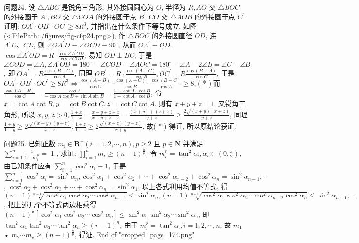 问题24. 设 $\triangle A B C$ 是锐角三角形, 其外接圆圆心为 $O$, 半径为 $R, A O$ 交 $\triangle B O C$ 的外接圆于 $A^{\prime}, B O$ 交 $\triangle C O A$ 的外接圆于点 $B^{\prime}, C O$ 交 $\triangle A O B$ 的外接圆于点 $C^{\prime}$. 证明: $O A^{\prime} \cdot O B^{\prime} \cdot O C^{\prime} \geqslant 8 R^3$, 并指出在什么条件下等号成立.
如图(<FilePath:./figures/fig-c6p24.png>), 作 $\triangle B O C$ 的外接圆直径 $O D$, 连 $A^{\prime} D 、 C D$, 则 $\angle O A^{\prime} D=\angle O C D=90^{\circ}$, 从而 $O A^{\prime}=O D$. $\cos \angle A^{\prime} O D=R \cdot \frac{\cos \angle A^{\prime} O D}{\cos \angle C O D}$; 易知 $O D \perp B C$, 于是 $\angle C O D=\angle A, \angle A^{\prime} O D=180^{\circ}-\angle C O D- \angle A O C=180^{\circ}-\angle A-2 \angle B=\angle C-\angle B$, 即 $O A^{\prime}= R \frac{\cos (B-C)}{\cos A}$, 同理 $O B^{\prime}=R \cdot \frac{\cos (A-C)}{\cos B}, O C^{\prime}= R \frac{\cos (B-A)}{\cos C}$, 于是 $O A^{\prime} \cdot O B^{\prime} \cdot O C^{\prime} \geqslant 8 R^3 \Leftrightarrow\frac{\cos (A-B)}{\cos C} \cdot \frac{\cos (A-C)}{\cos B} \cdot \frac{\cos (B-C)}{\cos A} \geqslant 8$, ( * ) 而 $\frac{\cos (A-B)}{\cos C}= \frac{\cos A}{-\cos A \cos B+\sin A \sin B}=\frac{1+\cot A \cdot \cot B}{1-\cot A \cdot \cot B}$, 令 $x=\cot A \cot B, y= \cot B \cot C, z=\cot C \cot A$. 则有 $x+y+z=1$, 又锐角三角形, 所以 $x, y$, $z>0, \frac{1+x}{1-x}=\frac{x+y+z+x}{x+y+z-x}=\frac{(x+y)+(z+x)}{y+z} \geqslant \frac{2 \sqrt{(x+y)(x+z)}}{y+z}$, 同理 $\frac{1+y}{1-y} \geqslant 2 \frac{\sqrt{(x+y)(y+z)}}{x+z}, \frac{1+z}{1-z} \geqslant 2 \frac{\sqrt{(x+z)(y+z)}}{x+y}$, 故( * ) 得证, 所以原结论获证.



问题25. 已知正数 $m_i \in \mathbf{R}^{+}(i=1,2, \cdots, n), p \geqslant 2$ 且 $p \in \mathbf{N}$ 并满足 $\sum_{i=1}^n \frac{1}{1+m_i^p}=$ 1 , 求证: $\prod_{i=1}^n m_i \geqslant(n-1)^{\frac{n}{p}}$.
令 $m_i^p=\tan ^2 \alpha_i, \alpha_i \in\left(0, \frac{\pi}{2}\right)$, 由已知条件应有 $\sum_{i=1}^n \cos ^2 \alpha_i=1$, 于是 $\sum_{i=1}^{n-1} \cos ^2 \alpha_i=\sin ^2 \alpha_n, \cos ^2 \alpha_1+\cos ^2 \alpha_2+\cdots+\cos ^2 \alpha_{n-2}+\cos ^2 \alpha_n=\sin ^2 \alpha_{n-1}, \cdots$, $\cos ^2 \alpha_2+\cos ^2 \alpha_3+\cdots+\cos ^2 \alpha_n=\sin ^2 \alpha_1$, 以上各式利用均值不等式, 得 $(n-1) \sqrt[n-1]{\cos ^2 \alpha_1 \cos ^2 \alpha_2 \cdots \cos ^2 \alpha_{n-1}} \leqslant \sin ^2 \alpha_n,(n-1) \sqrt[n-1]{\cos ^2 \alpha_1 \cos ^2 \alpha_2 \cdots \cos ^2 \alpha_{n-2} \cos ^2 \alpha_n} \leqslant \sin ^2 \alpha_{n-1}, \cdots, \quad(n-1) \sqrt[n-1]{\cos ^2 \alpha_2 \cos ^2 \alpha_3 \cdots \cos ^2 \alpha_n} \leqslant \sin ^2 \alpha_1$, 把上述几个不等式两边相乘得 $(n-1)^n\left[\cos ^2 \alpha_1 \cos ^2 \alpha_2 \cdots \cos ^2 \alpha_n\right] \leqslant \sin ^2 \alpha_1 \sin ^2 \alpha_2 \cdots \sin ^2 \alpha_n$, 即 $\tan ^2 \alpha_1 \tan ^2 \alpha_2 \cdots \tan ^2 \alpha_n \geqslant(n-1)^n$, 由于 $m_i^p=\tan ^2 \alpha_i, i=1,2, \cdots, n$, 故 $m_1$ • $m_2 \cdots m_n \geqslant(n-1)^{\frac{n}{p}}$, 得证.
End of "cropped_page_174.png"


